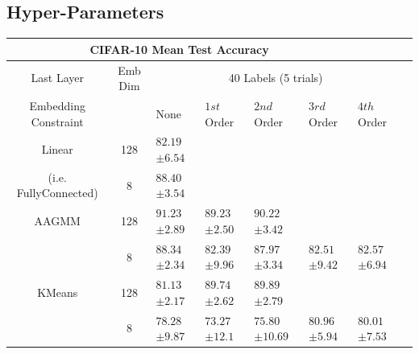 \documentclass[10pt,twocolumn,letterpaper]{article}
\begin{document}
\subsection{Hyper-Parameters}
\label{hyperparams}

\begin{table}[ht!]
	\begin{tabularx}{\textwidth}{c|c|XXXXXX}
		\multicolumn{6}{c}{CIFAR-10 Mean Test Accuracy} \\ \hline\hline
		Last Layer &   Emb Dim   & \multicolumn{5}{c}{40 Labels (5 trials)}            \\ 
		\hline
		Embedding Constraint  &  & None & $1st$ Order & $2nd$ Order & $3rd$ Order & $4th$ Order  \\ 
		\hline
		Linear & 128  & $82.19$ \scriptsize{$\pm 6.54$}   &  &  &  &   \\
		(i.e. FullyConnected) & 8  & $88.40$ \scriptsize{$\pm 3.54$}      &  &  &  &   \\
		\hline
		AAGMM & 128  & $\boldsymbol{91.23}$ \scriptsize{$\pm 2.89$}    & $89.23$ \scriptsize{$\pm 2.50$} & $90.22$ \scriptsize{$\pm 3.42$} &  &  \\
		& 8  & $88.34$ \scriptsize{$\pm 2.34$}    & $82.39$ \scriptsize{$\pm 9.96$} & $87.97$ \scriptsize{$\pm 3.34$} & $82.51$ \scriptsize{$\pm 9.42$} & $82.57$ \scriptsize{$\pm 6.94$} \\
		\hline
		KMeans & 128  & $81.13$ \scriptsize{$\pm 2.17$}    & $89.74$ \scriptsize{$\pm 2.62$} & $\boldsymbol{89.89}$ \scriptsize{$\pm 2.79$} &  &  \\
		& 8  & $78.28$ \scriptsize{$\pm 9.87$}    & $73.27$ \scriptsize{$\pm 12.1$} & $75.80$ \scriptsize{$\pm 10.69$} & $80.96$ \scriptsize{$\pm 5.94$} & $80.01$ \scriptsize{$\pm 7.53$}  \\
		

\end{tabularx}
\end{table}
\end{document}
